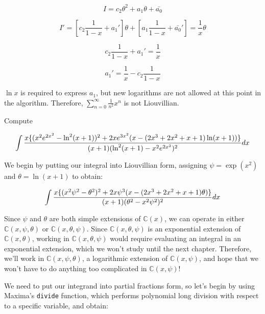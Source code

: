 $$I = c_2 \theta^2 + a_1 \theta + \bar{a_0}$$

$$I' = \left[ c_2 \frac{1}{1-x} + a_1' \right] \theta + \left[ a_1 \frac{1}{1-x} + \bar{a_0}' \right] = \frac{1}{x}\theta$$

$$c_2 \frac{1}{1-x} + a_1' = \frac{1}{x}$$

$$a_1' = \frac{1}{x} - c_2 \frac{1}{1-x}$$

$\ln x$ is required to express $a_1$, but new logarithms are not
allowed at this point in the algorithm.  Therefore,
$\sum_{n=0}^\infty \frac{1}{n^2} x^n$ is not Liouvillian.

\endexample

\vfill\eject

\example\label{hard log-exp integral}
Compute


$$\int{{x\{(x^2e^{2x^2}-\ln^2(x+1))^2+2xe^{3x^2}(x-(2x^3+2x^2+x+1)\ln(x+1))\}}\over{(x+1)(\ln^2(x+1) - x^2e^{2x^2})^2}} dx$$

We begin by putting our integral into Liouvillian form, assigning $\psi = \exp(x^2)$ and $\theta = \ln (x+1)$ to obtain:



$$\int{{x\{(x^2 \psi^2-\theta^2)^2+2x \psi^3(x-(2x^3+2x^2+x+1)\theta)\}}\over{(x+1)(\theta^2 - x^2\psi^2)^2}} dx$$

Since $\psi$ and $\theta$ are both simple extensions of ${\mathbb C}(x)$, we can operate in either
${\mathbb C}(x,\psi,\theta)$ or ${\mathbb C}(x,\theta,\psi)$.  Since ${\mathbb C}(x,\theta,\psi)$
is an exponential extension of ${\mathbb C}(x,\theta)$, working in ${\mathbb C}(x,\theta,\psi)$
would require evaluating an integral in an exponential extension, which we won't study until
the next chapter.  Therefore, we'll work in ${\mathbb C}(x,\psi,\theta)$, a logarithmic
extension of ${\mathbb C}(x,\psi)$, and hope that we won't have to do anything
too complicated in ${\mathbb C}(x,\psi)$!

We need to put our integrand into partial fractions form, so let's begin by
using Maxima's {\tt divide} function, which performs polynomial long division
with respect to a specific variable, and obtain:


